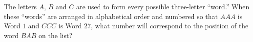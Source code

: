 The letters $A$, $B$ and $C$ are used to form every possible three-letter ``word.'' When these ``words'' are arranged in alphabetical order and numbered so that $AAA$ is Word $1$ and $CCC$ is Word $27$, what number will correspond to the position of the word $BAB$ on the list?
